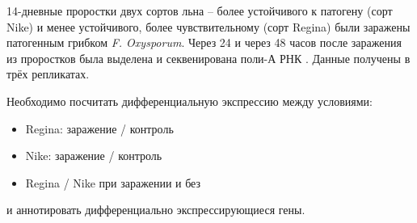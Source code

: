 14-дневные проростки двух сортов льна -- более устойчивого к патогену (сорт Nike) и менее устойчивого, более чувствительному (сорт Regina) были заражены патогенным грибком \textit{F. Oxysporum}.
Через 24 и через 48 часов после заражения из проростков была выделена и секвенирована поли-А РНК \cite{boba2018}.
Данные получены в трёх репликатах.

Необходимо посчитать дифференциальную экспрессию между условиями:

\begin{itemize}[noitemsep]
    \item Regina: заражение / контроль
    \item Nike: заражение / контроль
    \item Regina / Nike при заражении и без
\end{itemize}

и аннотировать дифференциально экспрессирующиеся гены.
